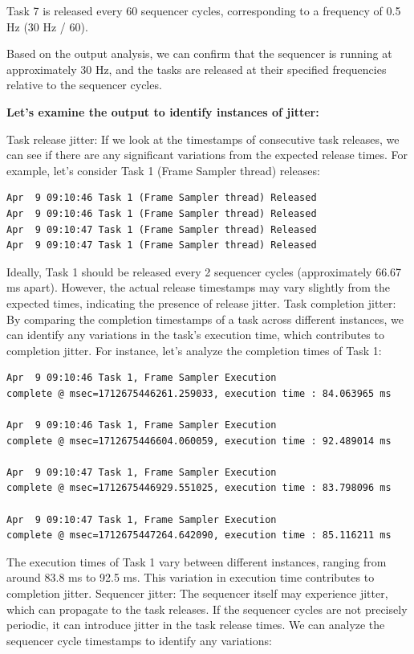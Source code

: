 \documentclass[a4paper,11pt]{article}%
\newenvironment{qanda}{\setlength{\parindent}{0pt}}{\bigskip}
\begin{document}
\begin{qanda}
\begin{enumerate}
\begin{enumerate}
				      Task 7 is released every 60 sequencer cycles, corresponding to a frequency of 0.5 Hz (30 Hz / 60).


			\end{enumerate}






			Based on the output analysis, we can confirm that the sequencer is running at approximately 30 Hz, and the tasks are released at their specified frequencies relative to the sequencer cycles.


			\textbf{Let's examine the output to identify instances of jitter:}

			Task release jitter: If we look at the timestamps of consecutive task releases, we can see if there are any significant variations from the expected release times. For example, let's consider Task 1 (Frame Sampler thread) releases:

			\begin{lstlisting}
Apr  9 09:10:46 Task 1 (Frame Sampler thread) Released
Apr  9 09:10:46 Task 1 (Frame Sampler thread) Released
Apr  9 09:10:47 Task 1 (Frame Sampler thread) Released
Apr  9 09:10:47 Task 1 (Frame Sampler thread) Released
\end{lstlisting}

			Ideally, Task 1 should be released every 2 sequencer cycles (approximately 66.67 ms apart). However, the actual release timestamps may vary slightly from the expected times, indicating the presence of release jitter.
			Task completion jitter: By comparing the completion timestamps of a task across different instances, we can identify any variations in the task's execution time, which contributes to completion jitter. For instance, let's analyze the completion times of Task 1:


			\begin{lstlisting}
Apr  9 09:10:46 Task 1, Frame Sampler Execution 
complete @ msec=1712675446261.259033, execution time : 84.063965 ms

Apr  9 09:10:46 Task 1, Frame Sampler Execution 
complete @ msec=1712675446604.060059, execution time : 92.489014 ms

Apr  9 09:10:47 Task 1, Frame Sampler Execution 
complete @ msec=1712675446929.551025, execution time : 83.798096 ms

Apr  9 09:10:47 Task 1, Frame Sampler Execution 
complete @ msec=1712675447264.642090, execution time : 85.116211 ms
\end{lstlisting}
			The execution times of Task 1 vary between different instances, ranging from around 83.8 ms to 92.5 ms. This variation in execution time contributes to completion jitter.
			Sequencer jitter: The sequencer itself may experience jitter, which can propagate to the task releases. If the sequencer cycles are not precisely periodic, it can introduce jitter in the task release times. We can analyze the sequencer cycle timestamps to identify any variations:


\end{enumerate}
\end{qanda}
\end{document}
